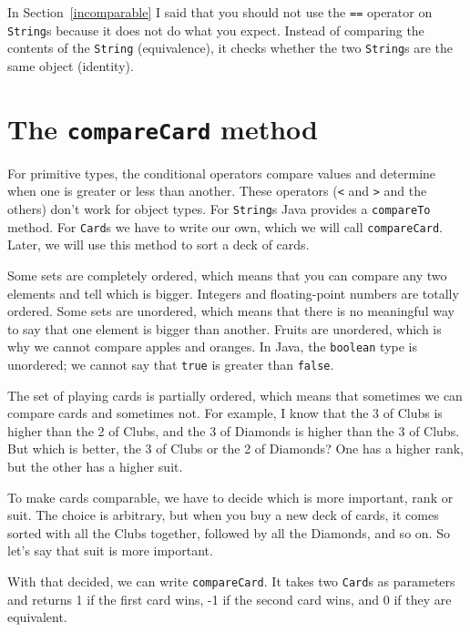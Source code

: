 \documentclass[12pt]{book}
\theoremstyle{exercise}
\begin{document}
In Section~\ref{incomparable} I said that you should not use the
{\tt ==} operator on {\tt String}s because it does not do what you
expect.  Instead of comparing the contents of the {\tt String}
(equivalence), it checks whether the two {\tt String}s are the same
object (identity).


\section{The {\tt compareCard} method}
\label{compare}

For primitive types, the conditional operators
compare values and determine when one is greater or less
than another.  These operators ({\tt <} and {\tt >} and the others)
don't work for object types.  For {\tt String}s Java provides
a {\tt compareTo} method.  For {\tt Card}s we have
to write our own, which we will call {\tt compareCard}.
Later, we will use this method to sort a deck of cards.


Some sets are completely ordered, which means that you can compare any
two elements and tell which is bigger.  Integers and floating-point
numbers are totally ordered.  Some sets are unordered, which means
that there is no meaningful way to say that one element is bigger than
another.  Fruits are unordered, which is why we cannot compare apples
and oranges.  In Java, the {\tt boolean} type is unordered; we cannot
say that {\tt true} is greater than {\tt false}.

The set of playing cards is partially ordered, which means that
sometimes we can compare cards and sometimes not.  For example, I know
that the 3 of Clubs is higher than the 2 of Clubs, and the 3 of
Diamonds is higher than the 3 of Clubs.  But which is better, the 3 of
Clubs or the 2 of Diamonds?  One has a higher rank, but the other has
a higher suit.

To make cards comparable, we have to decide which is more
important, rank or suit.  The choice is
arbitrary, but when you buy a new deck of cards, it comes sorted
with all the Clubs together, followed by all the Diamonds, and so on.
So let's say that suit is more important.

With that decided, we can write {\tt compareCard}.  It
takes two {\tt Card}s as parameters and returns 1 if
the first card wins, -1 if the second card wins, and 0 if
they are equivalent.
\end{document}
